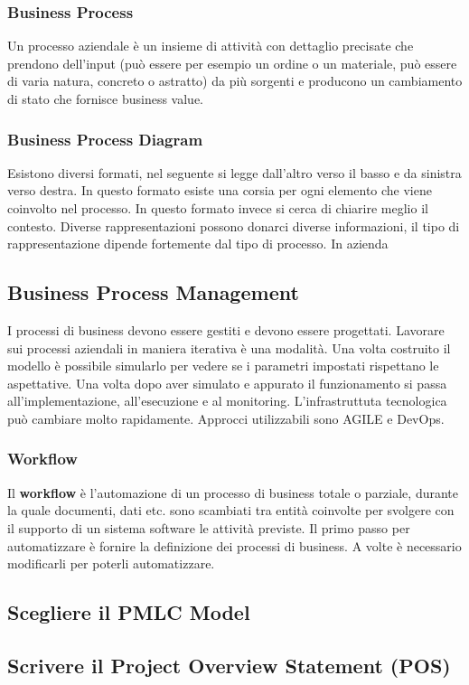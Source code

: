 \subsubsection{Business Process}
Un processo aziendale è un insieme di attività con dettaglio precisate che prendono dell'input (può essere per esempio un ordine o un materiale, può essere di varia natura, concreto o astratto) da più sorgenti e producono un cambiamento di stato che fornisce business value. 
\subsubsection{Business Process Diagram}
Esistono diversi formati, nel seguente si legge dall'altro verso il basso e da sinistra verso destra.
In questo formato esiste una corsia per ogni elemento che viene coinvolto nel processo.
In questo formato invece si cerca di chiarire meglio il contesto.
Diverse rappresentazioni possono donarci diverse informazioni, il tipo di rappresentazione dipende fortemente dal tipo di processo. In azienda
\subsection{Business Process Management}
I processi di business devono essere gestiti e devono essere progettati. Lavorare sui processi aziendali in maniera iterativa è una modalità. Una volta costruito il modello è possibile simularlo per vedere se i parametri impostati rispettano le aspettative. Una volta dopo aver simulato e appurato il funzionamento si passa all'implementazione, all'esecuzione e al monitoring. L'infrastruttuta tecnologica può cambiare molto rapidamente. Approcci utilizzabili sono AGILE e DevOps.

\subsubsection{Workflow}
Il \textbf{workflow} è l'automazione di un processo di business totale o parziale, durante la quale documenti, dati etc. sono scambiati tra entità coinvolte per svolgere con il supporto di un sistema software le attività previste.\newline
Il primo passo per automatizzare è fornire la definizione dei processi di business. A volte è necessario modificarli per poterli automatizzare.
\subsection{Scegliere il PMLC Model}
\subsection{Scrivere il Project Overview Statement (POS)}
\newpage